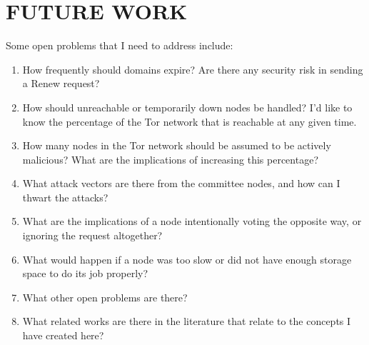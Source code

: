 
\chapter{FUTURE WORK}

Some open problems that I need to address include:

\begin{enumerate}
	\item How frequently should domains expire? Are there any security risk in sending a Renew request?
	\item How should unreachable or temporarily down nodes be handled? I'd like to know the percentage of the Tor network that is reachable at any given time.
	\item How many nodes in the Tor network should be assumed to be actively malicious? What are the implications of increasing this percentage?
	\item What attack vectors are there from the committee nodes, and how can I thwart the attacks?
	\item What are the implications of a node intentionally voting the opposite way, or ignoring the request altogether?
	\item What would happen if a node was too slow or did not have enough storage space to do its job properly?
	\item What other open problems are there?
	\item What related works are there in the literature that relate to the concepts I have created here?
\end{enumerate}